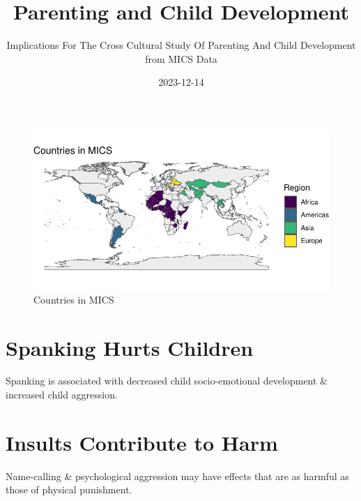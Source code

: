 \documentclass[
  letterpaper,
  DIV=11,
  numbers=noendperiod]{scrartcl}
\title{Parenting and Child Development}
\subtitle{Implications For The Cross Cultural Study Of Parenting And
Child Development from MICS Data}
\author{}
\date{2023-12-14}
\makeatletter
\renewcommand{\maketitle}{\bgroup\setlength{\parindent}{0pt}
\begin{flushleft}
  {\sffamily\huge\textbf{\MakeUppercase{\@title}}} \vspace{0.3cm} \newline
  {\Large {\@subtitle}} \newline
  \@author
\end{flushleft}\egroup
}
\makeatother
\begin{document}
\maketitle
\pagestyle{mystyle}

\ifdefined\Shaded\renewenvironment{Shaded}{\begin{tcolorbox}[sharp corners, colback={codebgcolor}, frame hidden, borderline west={3pt}{0pt}{shadecolor}, boxrule=0pt, breakable, enhanced]}{\end{tcolorbox}}\fi

\begin{figure}[H]

{\centering \includegraphics{MICS-infographic_files/figure-pdf/fig-MICS-1.pdf}

}

\caption{\label{fig-MICS}Countries in MICS}

\end{figure}

\hypertarget{spanking-hurts-children}{%
\section{Spanking Hurts Children}\label{spanking-hurts-children}}

Spanking is associated with decreased child socio-emotional development
\& increased child aggression.

\hypertarget{insults-contribute-to-harm}{%
\section{Insults Contribute to Harm}\label{insults-contribute-to-harm}}

Name-calling \& psychological aggression may have effects that are as
harmful as those of physical punishment.
\end{document}
